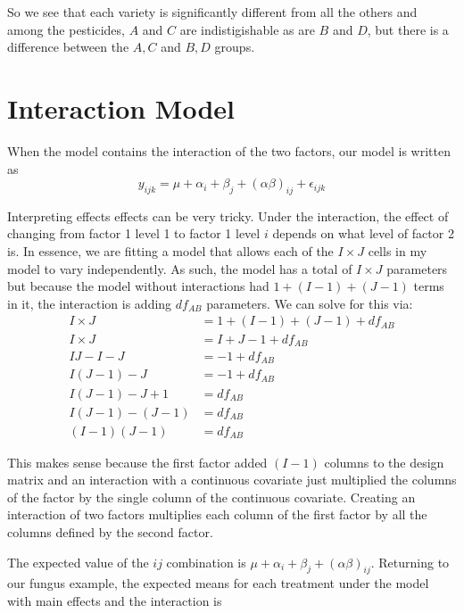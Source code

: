 \documentclass[]{book}
\theoremstyle{definition}
\theoremstyle{definition}
\theoremstyle{remark}
\begin{document}
So we see that each variety is significantly different from all the
others and among the pesticides, \(A\) and \(C\) are indistigishable as
are \(B\) and \(D\), but there is a difference between the \(A,C\) and
\(B,D\) groups.

\section{Interaction Model}\label{interaction-model}

When the model contains the interaction of the two factors, our model is
written as
\[y_{ijk}=\mu+\alpha_{i}+\beta_{j}+\left(\alpha\beta\right)_{ij}+\epsilon_{ijk}\]

Interpreting effects effects can be very tricky. Under the interaction,
the effect of changing from factor 1 level 1 to factor 1 level \(i\)
depends on what level of factor 2 is. In essence, we are fitting a model
that allows each of the \(I\times J\) cells in my model to vary
independently. As such, the model has a total of \(I\times J\)
parameters but because the model without interactions had
\(1+(I-1)+(J-1)\) terms in it, the interaction is adding \(df_{AB}\)
parameters. We can solve for this via: \[\begin{aligned}
I\times J   &=  1+(I-1)+(J-1)+df_{AB} \\
I\times J   &=  I+J-1+df_{AB} \\
IJ-I-J    &=    -1+df_{AB} \\
I(J-1)-J    &=  -1+df_{AB} \\
I(J-1)-J+1  &=  df_{AB}  \\
I(J-1)-(J-1)    &=  df_{AB} \\
(I-1)(J-1)  &=  df_{AB} 
\end{aligned}\]

This makes sense because the first factor added \((I-1)\) columns to the
design matrix and an interaction with a continuous covariate just
multiplied the columns of the factor by the single column of the
continuous covariate. Creating an interaction of two factors multiplies
each column of the first factor by all the columns defined by the second
factor.

The expected value of the \(ij\) combination is
\(\mu+\alpha_{i}+\beta_{j}+\left(\alpha\beta\right)_{ij}\). Returning to
our fungus example, the expected means for each treatment under the
model with main effects and the interaction is
\end{document}
